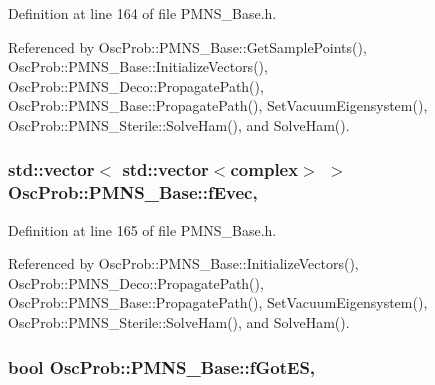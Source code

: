 Definition at line 164 of file P\+M\+N\+S\+\_\+\+Base.\+h.



Referenced by Osc\+Prob\+::\+P\+M\+N\+S\+\_\+\+Base\+::\+Get\+Sample\+Points(), Osc\+Prob\+::\+P\+M\+N\+S\+\_\+\+Base\+::\+Initialize\+Vectors(), Osc\+Prob\+::\+P\+M\+N\+S\+\_\+\+Deco\+::\+Propagate\+Path(), Osc\+Prob\+::\+P\+M\+N\+S\+\_\+\+Base\+::\+Propagate\+Path(), Set\+Vacuum\+Eigensystem(), Osc\+Prob\+::\+P\+M\+N\+S\+\_\+\+Sterile\+::\+Solve\+Ham(), and Solve\+Ham().

\subsubsection[{\texorpdfstring{f\+Evec}{fEvec}}]{\setlength{\rightskip}{0pt plus 5cm}std\+::vector$<$ std\+::vector$<${\bf complex}$>$ $>$ Osc\+Prob\+::\+P\+M\+N\+S\+\_\+\+Base\+::f\+Evec\hspace{0.3cm}{\ttfamily [protected]}, {\ttfamily [inherited]}}\hypertarget{classOscProb_1_1PMNS__Base_a093e7bd31d4ef52ed52df414e12c1d17}{}\label{classOscProb_1_1PMNS__Base_a093e7bd31d4ef52ed52df414e12c1d17}


Definition at line 165 of file P\+M\+N\+S\+\_\+\+Base.\+h.



Referenced by Osc\+Prob\+::\+P\+M\+N\+S\+\_\+\+Base\+::\+Initialize\+Vectors(), Osc\+Prob\+::\+P\+M\+N\+S\+\_\+\+Deco\+::\+Propagate\+Path(), Osc\+Prob\+::\+P\+M\+N\+S\+\_\+\+Base\+::\+Propagate\+Path(), Set\+Vacuum\+Eigensystem(), Osc\+Prob\+::\+P\+M\+N\+S\+\_\+\+Sterile\+::\+Solve\+Ham(), and Solve\+Ham().

\subsubsection[{\texorpdfstring{f\+Got\+ES}{fGotES}}]{\setlength{\rightskip}{0pt plus 5cm}bool Osc\+Prob\+::\+P\+M\+N\+S\+\_\+\+Base\+::f\+Got\+ES\hspace{0.3cm}{\ttfamily [protected]}, {\ttfamily [inherited]}}\hypertarget{classOscProb_1_1PMNS__Base_a6dc5cd010d2d70b2324745b4e53e9839}{}\label{classOscProb_1_1PMNS__Base_a6dc5cd010d2d70b2324745b4e53e9839}


